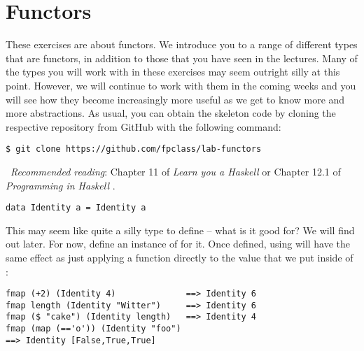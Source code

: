 \section{Functors}

These exercises are about functors. We introduce you to a range of different types that are functors, in addition to those that you have seen in the lectures. Many of the types you will work with in these exercises may seem outright silly at this point. However, we will continue to work with them in the coming weeks and you will see how they become increasingly more useful as we get to know more and more abstractions. As usual, you can obtain the skeleton code by cloning the respective repository from GitHub with the following command:
\begin{verbatim}
$ git clone https://github.com/fpclass/lab-functors
\end{verbatim}

\makebox[0.5cm]{\faBook}~\emph{Recommended reading}: Chapter 11 of \emph{Learn you a Haskell} \citep{lipovaca2011learn} or Chapter 12.1 of \emph{Programming in Haskell} \citep{hutton2016programming}.

\taskLine

\begin{verbatim}
data Identity a = Identity a
\end{verbatim}
This may seem like quite a silly type to define -- what is it good for? We will find out later. For now, define an instance of  for it. Once defined, using  will have the same effect as just applying a function directly to the value that we put inside of :
\begin{verbatim}
fmap (+2) (Identity 4)              ==> Identity 6
fmap length (Identity "Witter")     ==> Identity 6
fmap ($ "cake") (Identity length)   ==> Identity 4
fmap (map (=='o')) (Identity "foo") 
==> Identity [False,True,True]
\end{verbatim} 



